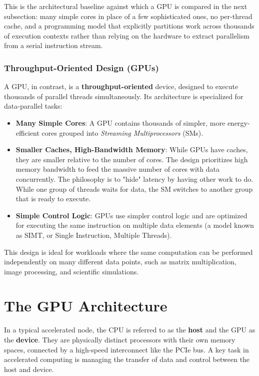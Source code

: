 This is the architectural baseline against which a GPU is compared in the next subsection: many simple cores in place of a few sophisticated ones, no per-thread cache, and a programming model that explicitly partitions work across thousands of execution contexts rather than relying on the hardware to extract parallelism from a serial instruction stream.

\subsubsection{Throughput-Oriented Design (GPUs)}
A GPU, in contrast, is a \textbf{throughput-oriented} device, designed to execute thousands of parallel threads simultaneously. Its architecture is specialized for data-parallel tasks:
\begin{itemize}
    \item \textbf{Many Simple Cores}: A GPU contains thousands of simpler, more energy-efficient cores grouped into \textit{Streaming Multiprocessors} (SMs).
    \item \textbf{Smaller Caches, High-Bandwidth Memory}: While GPUs have caches, they are smaller relative to the number of cores. The design prioritizes high memory bandwidth to feed the massive number of cores with data concurrently. The philosophy is to "hide" latency by having other work to do. While one group of threads waits for data, the SM switches to another group that is ready to execute.
    \item \textbf{Simple Control Logic}: GPUs use simpler control logic and are optimized for executing the same instruction on multiple data elements (a model known as SIMT, or Single Instruction, Multiple Threads).
\end{itemize}
This design is ideal for workloads where the same computation can be performed independently on many different data points, such as matrix multiplication, image processing, and scientific simulations.

\section{The GPU Architecture}

In a typical accelerated node, the CPU is referred to as the \textbf{host} and the GPU as the \textbf{device}. They are physically distinct processors with their own memory spaces, connected by a high-speed interconnect like the PCIe bus. A key task in accelerated computing is managing the transfer of data and control between the host and device.

